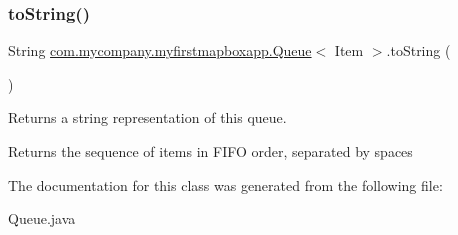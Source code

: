 \subsubsection{\texorpdfstring{to\+String()}{toString()}}
{\footnotesize\ttfamily String \hyperlink{classcom_1_1mycompany_1_1myfirstmapboxapp_1_1_queue}{com.\+mycompany.\+myfirstmapboxapp.\+Queue}$<$ Item $>$.to\+String (\begin{DoxyParamCaption}{ }\end{DoxyParamCaption})\hspace{0.3cm}{\ttfamily [inline]}}

Returns a string representation of this queue.

\begin{DoxyReturn}{Returns}
the sequence of items in F\+I\+FO order, separated by spaces 
\end{DoxyReturn}


The documentation for this class was generated from the following file\+:\begin{DoxyCompactItemize}
\item 
Queue.\+java\end{DoxyCompactItemize}
